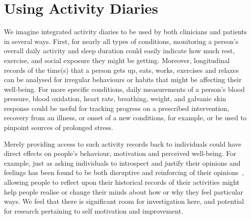 \documentclass{chi-ext}
\begin{document}
\section{Using Activity Diaries}

We imagine integrated activity diaries to be used by both clinicians
and patients in several ways.  First, for nearly all types of
conditions, monitoring a person's overall daily activity and sleep
duration could easily indicate how much rest, exercise, and social
exposure they might be getting.  Moreover, longitudinal records of the
time(s) that a person gets up, eats, works, exercises and relaxes can
be analysed for irregular behaviours or habits that might be affecting
their well-being. For more specific conditions, daily
measurements of a person's blood pressure, blood oxidation, heart
rate, breathing, weight, and galvanic skin response could be useful
for tracking progress on a prescribed intervention, recovery from an
illness, or onset of a new conditions, for example, or be used to
pinpoint sources of prolonged stress.

Merely providing access to such activity records back to individuals
could have direct effects on people's behaviour, motivation and
perceived well-being.  For example, just as asking individuals to
introspect and justify their opinions and feelings has been found to
be both disruptive and reinforcing of their opinions~\cite{wilson1989introspection},
allowing people to reflect upon their
historical records of their activities might help people realise or
change their minds about how or why they feel particular ways. We feel
that there is significant room for investigation here, and potential
for research pertaining to self motivation and improvement.
\end{document}
